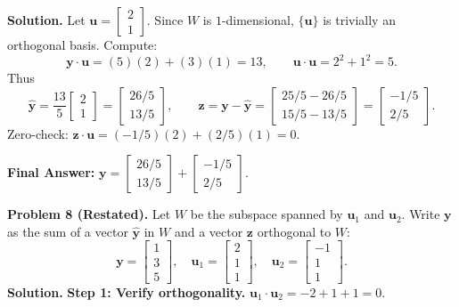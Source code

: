 \documentclass[11pt, letterpaper]{article}
\theoremstyle{definition}
\theoremstyle{remark}
\begin{document}
\textbf{Solution.} Let $\mathbf{u} = \begin{bmatrix} 2 \\ 1 \end{bmatrix}$. Since $W$ is $1$-dimensional, $\{\mathbf{u}\}$ is trivially an orthogonal basis. Compute:
\[
\mathbf{y} \cdot \mathbf{u} = (5)(2) + (3)(1) = 13, \qquad \mathbf{u} \cdot \mathbf{u} = 2^2 + 1^2 = 5.
\]
Thus
\[
\hat{\mathbf{y}} = \frac{13}{5}\begin{bmatrix} 2 \\ 1 \end{bmatrix} = \begin{bmatrix} 26/5 \\ 13/5 \end{bmatrix}, \qquad \mathbf{z} = \mathbf{y} - \hat{\mathbf{y}} = \begin{bmatrix} 25/5 - 26/5 \\ 15/5 - 13/5 \end{bmatrix} = \begin{bmatrix} -1/5 \\ 2/5 \end{bmatrix}.
\]
Zero-check: $\mathbf{z} \cdot \mathbf{u} = (-1/5)(2) + (2/5)(1) = 0$.

\textbf{Final Answer:} $\mathbf{y} = \begin{bmatrix} 26/5 \\ 13/5 \end{bmatrix} + \begin{bmatrix} -1/5 \\ 2/5 \end{bmatrix}$.

\medskip
\textbf{Problem 8 (Restated).} Let $W$ be the subspace spanned by $\mathbf{u}_1$ and $\mathbf{u}_2$. Write $\mathbf{y}$ as the sum of a vector $\hat{\mathbf{y}}$ in $W$ and a vector $\mathbf{z}$ orthogonal to $W$:
\[
\mathbf{y} = \begin{bmatrix} 1 \\ 3 \\ 5 \end{bmatrix}, \quad \mathbf{u}_1 = \begin{bmatrix} 2 \\ 1 \\ 1 \end{bmatrix}, \quad \mathbf{u}_2 = \begin{bmatrix} -1 \\ 1 \\ 1 \end{bmatrix}.
\]
\textbf{Solution.}
\textbf{Step 1: Verify orthogonality.} $\mathbf{u}_1 \cdot \mathbf{u}_2 = -2 + 1 + 1 = 0$.
\end{document}
